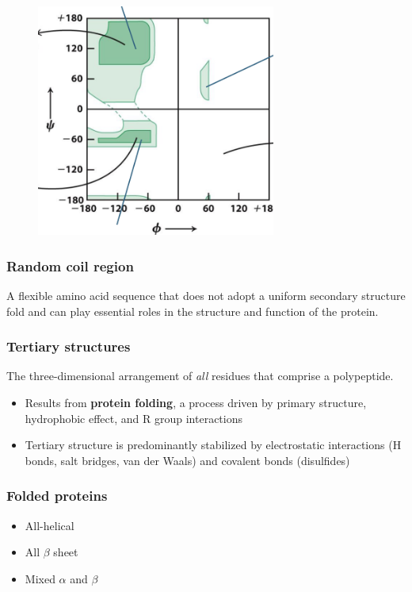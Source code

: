 \documentclass[letterpaper, 12pt]{article}
\begin{document}
\begin{figure}[H]
\centering
\includegraphics[width=0.7\textwidth]{ramachandran}
\end{figure}

\subsubsection*{Random coil region}
A flexible amino acid sequence that does not adopt a uniform secondary structure fold and can play essential roles in the structure and function of the protein.

\subsubsection*{Tertiary structures}
The three-dimensional arrangement of \textit{all} residues that comprise a polypeptide. 

\begin{itemize}
\item Results from \textbf{protein folding}, a process driven by primary structure, hydrophobic effect, and R group interactions
\item Tertiary structure is predominantly stabilized by electrostatic interactions (H bonds, salt bridges, van der Waals) and covalent bonds (disulfides)
\end{itemize}

\subsubsection*{Folded proteins}
\begin{itemize}
\item All-helical
\item All $\beta$ sheet
\item Mixed $\alpha$ and $\beta$
\end{itemize}
\end{document}
